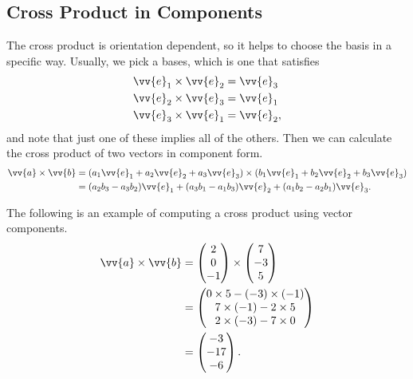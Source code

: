 \subsection{Cross Product in Components}

The cross product is orientation dependent, so it helps to choose the basis in a specific way. Usually, we pick a  bases, which is one that satisfies
\begin{align*}
    \vv{e}_1 \times \vv{e}_2 &= \vv{e}_3 \\
    \vv{e}_2 \times \vv{e}_3 &= \vv{e}_1 \\
    \vv{e}_3 \times \vv{e}_1 &= \vv{e}_2,
\end{align*} 
and note that just one of these implies all of the others.
Then we can calculate the cross product of two vectors in component form.
\begin{align*}
    \vv{a} \times \vv{b} &= (a_1 \vv{e}_1 + a_2 \vv{e}_2 + a_3 \vv{e}_3) \times (b_1 \vv{e}_1 + b_2 \vv{e}_2 + b_3 \vv{e}_3) \\
        &= (a_2 b_3 - a_3 b_2) \vv{e}_1 + (a_3 b_1 - a_1 b_3) \vv{e}_2 + (a_1 b_2 - a_2 b_1) \vv{e}_3.
\end{align*}

\begin{example}
    The following is an example of computing a cross product using vector components.
    \begin{align*}
        \vv{a} \times \vv{b} &= \begin{pmatrix}2 \\ 0 \\ -1\end{pmatrix}\times\begin{pmatrix}7 \\ -3 \\ 5\end{pmatrix} \\
        &= \begin{pmatrix}
            0 \times 5 - (-3) \times (-1) \\
            7 \times (-1) - 2 \times 5 \\
            2 \times (-3) - 7 \times 0
        \end{pmatrix} \\
        &= \begin{pmatrix}
            -3 \\ -17 \\ -6
        \end{pmatrix}.
    \end{align*}
\end{example}


